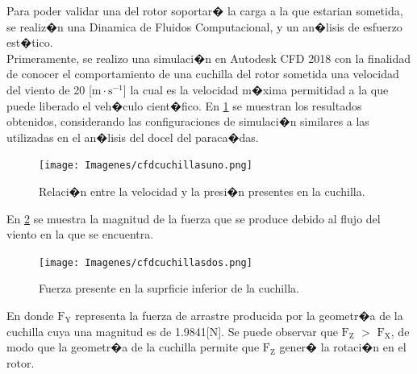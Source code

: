 \documentclass[10pt,a4paper]{book}
\begin{document}
Para poder validar una del rotor soportar� la carga a la que estarian sometida, se realiz�n una Dinamica de Fluidos Computacional, y un an�lisis de esfuerzo est�tico.\\
Primeramente, se realizo una simulaci�n en Autodesk CFD 2018 \textregistered con la finalidad de conocer el comportamiento de una cuchilla del rotor sometida una velocidad del viento de 20 [$ \text{m}\cdot \text{s}^{-1}$] la cual es la velocidad m�xima permitidad a la que puede liberado el veh�culo cient�fico.
En \ref{img:cfdcuchillasuno} se muestran los resultados obtenidos, considerando las configuraciones de simulaci�n similares a las utilizadas en el an�lisis del docel del paraca�das.\\

\begin{figure}[H]
\begin{center}
\texttt{[image: Imagenes/cfdcuchillasuno.png]}  
\caption{Relaci�n entre la velocidad y la presi�n presentes en la cuchilla. \label{img:cfdcuchillasuno}}
\end{center}
\end{figure}

En \ref{img:cfdcuchillasdos} se muestra la magnitud de la fuerza que se produce debido al flujo del viento en la que se encuentra. 

\begin{figure}[H]
\begin{center}
\texttt{[image: Imagenes/cfdcuchillasdos.png]}  
\caption{Fuerza presente en la suprficie inferior de la cuchilla. \label{img:cfdcuchillasdos}}
\end{center}
\end{figure}
En donde $\text{F}_{\text{Y}}$ representa la fuerza de arrastre producida por la geometr�a de la cuchilla cuya una magnitud es de 1.9841[$\text{N}$]. Se puede observar que $\text{F}_{\text{Z}}$ $>$ $\text{F}_{\text{X}}$, de modo que la geometr�a de la cuchilla permite que $\text{F}_{\text{Z}}$ gener� la rotaci�n en el rotor.
\end{document}
